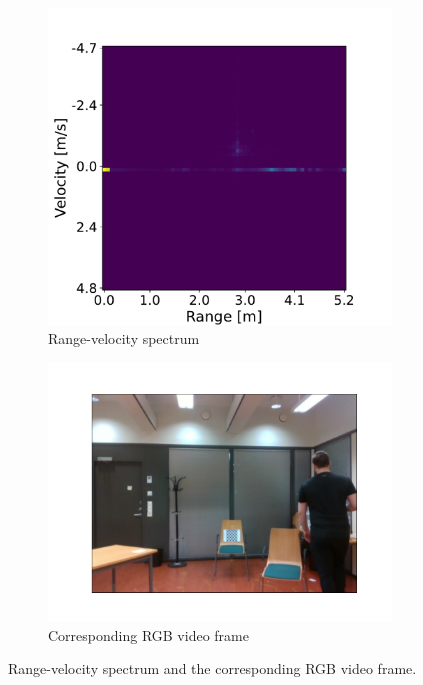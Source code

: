 \begin{figure}[H]
    \centering
    \begin{subfigure}[b]{0.49\textwidth}
        \centering
        \includegraphics[width=\textwidth]{fig/4/range-velocity.pdf}
        \caption{Range-velocity spectrum}
        \label{fig:range-velocity-unfiltered}
    \end{subfigure}
    \hfill
    \begin{subfigure}[b]{0.49\textwidth}
        \centering
        \includegraphics[width=\textwidth]{fig/4/range-velocity-rgb.pdf}
        \caption{Corresponding RGB video frame}
        \label{fig:range-velocity-rgb}
    \end{subfigure}
    \caption{
        Range-velocity spectrum and the corresponding RGB video frame.
    }
\end{figure}

